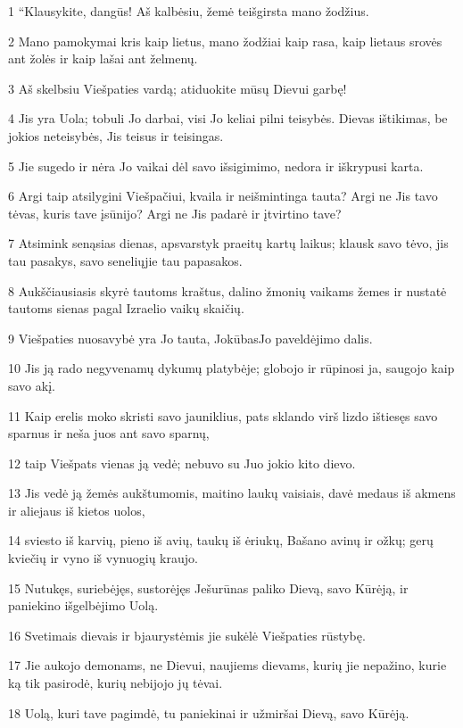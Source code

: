 \par 1 “Klausykite, dangūs! Aš kalbėsiu, žemė teišgirsta mano žodžius. 
\par 2 Mano pamokymai kris kaip lietus, mano žodžiai kaip rasa, kaip lietaus srovės ant žolės ir kaip lašai ant želmenų. 
\par 3 Aš skelbsiu Viešpaties vardą; atiduokite mūsų Dievui garbę! 
\par 4 Jis yra Uola; tobuli Jo darbai, visi Jo keliai pilni teisybės. Dievas ištikimas, be jokios neteisybės, Jis teisus ir teisingas. 
\par 5 Jie sugedo ir nėra Jo vaikai dėl savo išsigimimo, nedora ir iškrypusi karta. 
\par 6 Argi taip atsilygini Viešpačiui, kvaila ir neišmintinga tauta? Argi ne Jis tavo tėvas, kuris tave įsūnijo? Argi ne Jis padarė ir įtvirtino tave? 
\par 7 Atsimink senąsias dienas, apsvarstyk praeitų kartų laikus; klausk savo tėvo, jis tau pasakys, savo senelių­jie tau papasakos. 
\par 8 Aukščiausiasis skyrė tautoms kraštus, dalino žmonių vaikams žemes ir nustatė tautoms sienas pagal Izraelio vaikų skaičių. 
\par 9 Viešpaties nuosavybė yra Jo tauta, Jokūbas­Jo paveldėjimo dalis. 
\par 10 Jis ją rado negyvenamų dykumų platybėje; globojo ir rūpinosi ja, saugojo kaip savo akį. 
\par 11 Kaip erelis moko skristi savo jauniklius, pats sklando virš lizdo ištiesęs savo sparnus ir neša juos ant savo sparnų, 
\par 12 taip Viešpats vienas ją vedė; nebuvo su Juo jokio kito dievo. 
\par 13 Jis vedė ją žemės aukštumomis, maitino laukų vaisiais, davė medaus iš akmens ir aliejaus iš kietos uolos, 
\par 14 sviesto iš karvių, pieno iš avių, taukų iš ėriukų, Bašano avinų ir ožkų; gerų kviečių ir vyno iš vynuogių kraujo. 
\par 15 Nutukęs, suriebėjęs, sustorėjęs Ješurūnas paliko Dievą, savo Kūrėją, ir paniekino išgelbėjimo Uolą. 
\par 16 Svetimais dievais ir bjaurystėmis jie sukėlė Viešpaties rūstybę. 
\par 17 Jie aukojo demonams, ne Dievui, naujiems dievams, kurių jie nepažino, kurie ką tik pasirodė, kurių nebijojo jų tėvai. 
\par 18 Uolą, kuri tave pagimdė, tu paniekinai ir užmiršai Dievą, savo Kūrėją. 
